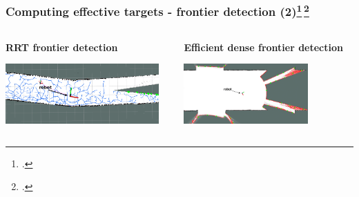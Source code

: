 \begin{frame}
	\frametitle{Computing effective targets - frontier detection (2)\footcite{Umari2017}$\,$\footcite{Orsulic2019}}
		\begin{columns}
				\begin{column}{0.5\textwidth}\centering
					{\bf{RRT frontier detection}}\\ 
					\vspace{0.2cm}
					\begin{center}
						\includegraphics[height=2.3cm]{figures/rrt2}
						\label{fig:cent}
					\end{center}
					\vspace{0.1cm}
				\end{column}
				\begin{column}{0.5\textwidth}\centering
					{\bf{Efficient dense frontier detection}}\\ 
					\vspace{0.2cm}
					\begin{center}
						\includegraphics[height=2.3cm]{figures/carto1}
						\label{fig:decent}
					\end{center}
				\end{column}
			\end{columns}
\end{frame}
		

